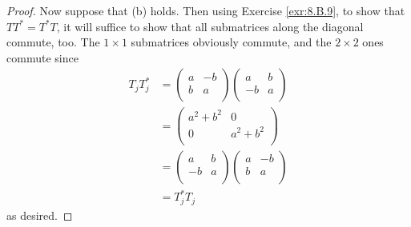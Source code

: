 \documentclass[../main.tex]{subfiles}
\begin{document}
\begin{itemize}
\begin{theorem}
\begin{proof}
            Now suppose that (b) holds. Then using Exercise \ref{exr:8.B.9}, to show that $TT^*=T^*T$, it will suffice to show that all submatrices along the diagonal commute, too. The $1\times 1$ submatrices obviously commute, and the $2\times 2$ ones commute since
            \begin{align*}
                T_jT_j^* &=
                \begin{pmatrix}
                    a & -b\\
                    b & a\\
                \end{pmatrix}
                \begin{pmatrix}
                    a & b\\
                    -b & a\\
                \end{pmatrix}\\
                &=
                \begin{pmatrix}
                    a^2+b^2 & 0\\
                    0 & a^2+b^2\\
                \end{pmatrix}\\
                &=
                \begin{pmatrix}
                    a & b\\
                    -b & a\\
                \end{pmatrix}
                \begin{pmatrix}
                    a & -b\\
                    b & a\\
                \end{pmatrix}\\
                &= T_j^*T_j
            \end{align*}
            as desired.
        \end{proof}
    \end{theorem}
\end{itemize}
\end{document}

